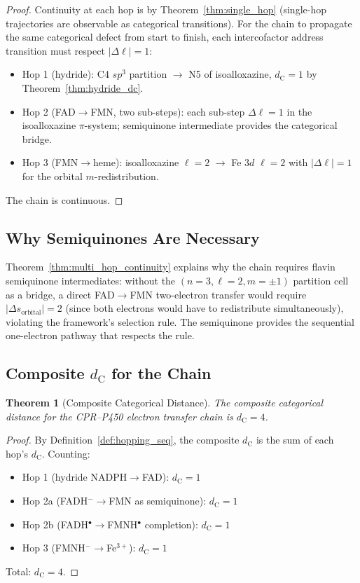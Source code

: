 \documentclass[11pt,twocolumn,a4paper]{article}
\newtheorem{theorem}{Theorem}[section]
\theoremstyle{definition}
\theoremstyle{remark}
\newcommand{\dC}{d_{\mathrm{C}}}
\begin{document}
\begin{proof}
Continuity at each hop is by Theorem~\ref{thm:single_hop} (single-hop
trajectories are observable as categorical transitions). For the chain
to propagate the same categorical defect from start to finish, each
intercofactor address transition must respect $|\Delta\ell| = 1$:
\begin{itemize}[nosep]
\item Hop 1 (hydride): C4 $sp^3$ partition $\to$ N5 of isoalloxazine, $\dC = 1$
  by Theorem~\ref{thm:hydride_dc}.
\item Hop 2 (FAD$\to$FMN, two sub-steps): each sub-step $\Delta\ell = 1$
  in the isoalloxazine $\pi$-system; semiquinone intermediate provides
  the categorical bridge.
\item Hop 3 (FMN$\to$heme): isoalloxazine $\ell = 2$ $\to$ Fe $3d$ $\ell = 2$
  with $|\Delta\ell| = 1$ for the orbital $m$-redistribution.
\end{itemize}
The chain is continuous.
\end{proof}

\subsection{Why Semiquinones Are Necessary}

Theorem~\ref{thm:multi_hop_continuity} explains why the chain requires
flavin semiquinone intermediates: without the
$(n=3, \ell=2, m=\pm 1)$ partition cell as a bridge, a direct FAD$\to$FMN
two-electron transfer would require $|\Delta s_{\mathrm{orbital}}| = 2$
(since both electrons would have to redistribute simultaneously),
violating the framework's selection rule. The semiquinone provides
the sequential one-electron pathway that respects the rule.

\subsection{Composite $\dC$ for the Chain}

\begin{theorem}[Composite Categorical Distance]
\label{thm:dc4_chain}
The composite categorical distance for the CPR--P450 electron transfer
chain is $\dC = 4$.
\end{theorem}

\begin{proof}
By Definition~\ref{def:hopping_seq}, the composite $\dC$ is the sum of
each hop's $\dC$. Counting:
\begin{itemize}[nosep]
\item Hop 1 (hydride NADPH$\to$FAD): $\dC = 1$
\item Hop 2a (FADH$^-$$\to$FMN as semiquinone): $\dC = 1$
\item Hop 2b (FADH$^\bullet$$\to$FMNH$^\bullet$ completion): $\dC = 1$
\item Hop 3 (FMNH$^-$$\to$Fe$^{3+}$): $\dC = 1$
\end{itemize}
Total: $\dC = 4$.
\end{proof}
\end{document}
